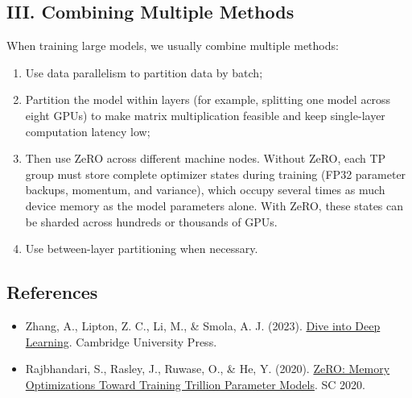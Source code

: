 \hypertarget{iii.-combining-multiple-methods}{%
\subsection{III. Combining Multiple Methods}\label{iii.-combining-multiple-methods}}

When training large models, we usually combine multiple methods:

\begin{enumerate}
\def\labelenumi{\arabic{enumi}.}
\item
  Use data parallelism to partition data by batch;
\item
  Partition the model within layers (for example, splitting one model across eight GPUs) to make matrix multiplication feasible and keep single-layer computation latency low;
\item
  Then use ZeRO across different machine nodes. Without ZeRO, each TP group must store complete optimizer states during training (FP32 parameter backups, momentum, and variance), which occupy several times as much device memory as the model parameters alone. With ZeRO, these states can be sharded across hundreds or thousands of GPUs.
\item
  Use between-layer partitioning when necessary.
\end{enumerate}

\FloatBarrier
{}
\hypertarget{references-36}{%
\subsection{References}\label{references-36}}

\vspace{0.25em}
\begin{itemize}
\tightlist
\item
  Zhang, A., Lipton, Z. C., Li, M., \& Smola, A. J. (2023). \href{https://D2L.ai}{Dive into Deep Learning}. Cambridge University Press.
\item
  Rajbhandari, S., Rasley, J., Ruwase, O., \& He, Y. (2020). \href{https://arxiv.org/abs/1910.02054}{ZeRO: Memory Optimizations Toward Training Trillion Parameter Models}. SC 2020.
\end{itemize}

\clearpage
